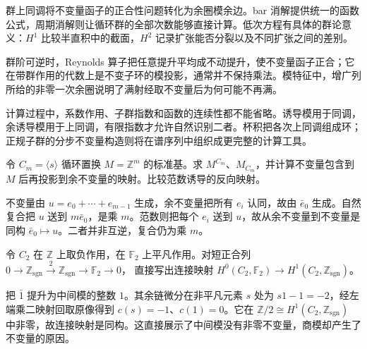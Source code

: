




\begin{chaptersummary}
群上同调将不变量函子的正合性问题转化为余圈模余边。bar 消解提供统一的函数公式，周期消解则让循环群的全部次数能够直接计算。低次方程有具体的群论意义：\(H^1\) 比较半直积中的截面，\(H^2\) 记录扩张能否分裂以及不同扩张之间的差别。

\ProseParagraphBreak
群阶可逆时，Reynolds 算子把任意提升平均成不动提升，使不变量函子正合；它在带群作用的代数上是不变子环的模投影，通常并不保持乘法。模特征中，增广列所给的非零一次余圈说明了满射经取不变量后为何可能不再满。

\ProseParagraphBreak
计算过程中，系数作用、子群指数和函数的连续性都不能省略。诱导模用于同调，余诱导模用于上同调，有限指数才允许自然识别二者。杯积把各次上同调组成环；正规子群的分步不变量构造则将在谱序列中组织成更完整的计算工具。
\end{chaptersummary}

\BookExercises

\begin{exercise}\label{b4:ex:11-permutation-invariants}
令 \(C_m=\langle s\rangle\) 循环置换 \(M=\mathbb Z^m\) 的标准基。求 \(M^{C_m}\)、\(M_{C_m}\)，并计算不变量包含到 \(M\) 后再投影到余不变量的映射。比较范数诱导的反向映射。
\end{exercise}
\begin{solution}
不变量由 \(u=e_0+\cdots+e_{m-1}\) 生成，余不变量把所有 \(e_i\) 认同，故由 \(\bar e_0\) 生成。自然复合把 \(u\) 送到 \(m\bar e_0\)，是乘 \(m\)。范数则把每个 \(e_i\) 送到 \(u\)，故从余不变量到不变量是同构 \(\bar e_0\mapsto u\)。二者并非互逆，复合仍为乘 \(m\)。
\end{solution}

\begin{exercise}\label{b4:ex:11-connecting-sign}
令 \(C_2\) 在 \(\mathbb Z\) 上取负作用，在 \(\mathbb F_2\) 上平凡作用。对短正合列
\(0\to\mathbb Z_{\mathrm{sgn}}\xrightarrow{2}\mathbb Z_{\mathrm{sgn}}\to\mathbb F_2\to0\)，
直接写出连接映射 \(H^0(C_2,\mathbb F_2)\to H^1(C_2,\mathbb Z_{\mathrm{sgn}})\)。
\end{exercise}
\begin{solution}
把 \(\bar1\) 提升为中间模的整数 \(1\)。其余链微分在非平凡元素 \(s\) 处为 \(s1-1=-2\)，经左端乘二映射回取原像得到 \(c(s)=-1\)、\(c(1)=0\)。它在 \(\mathbb Z/2\cong H^1(C_2,\mathbb Z_{\mathrm{sgn}})\) 中非零，故连接映射是同构。这直接展示了中间模没有非零不变量，商模却产生了不变量的原因。
\end{solution}


